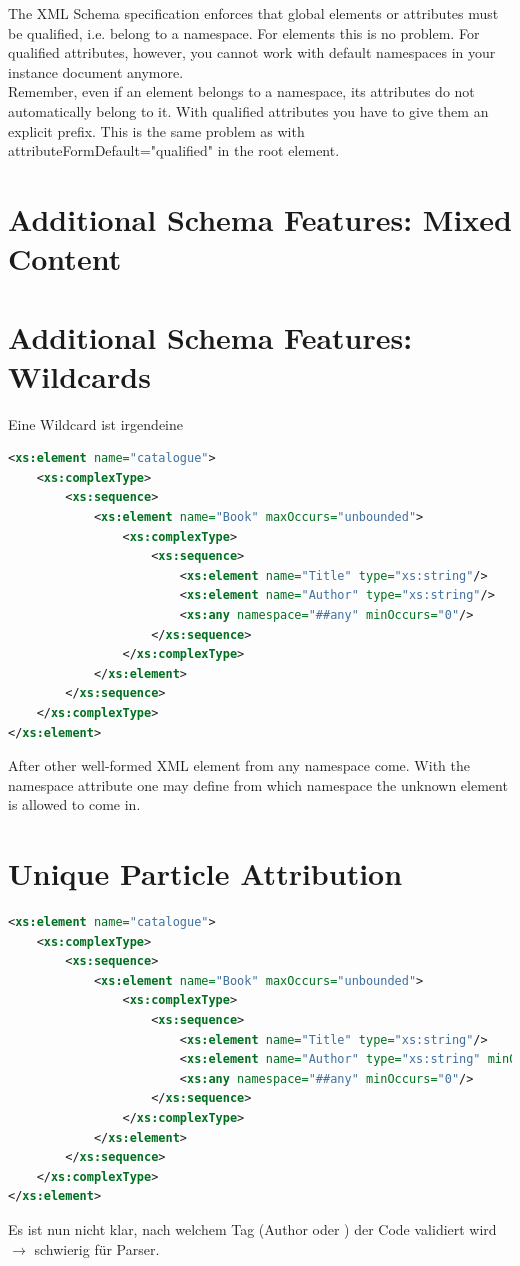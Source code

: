 The XML Schema specification enforces that global elements or attributes must be qualified, i.e. belong to a namespace. For elements this is no problem. For qualified attributes, however, you cannot work with default namespaces in your instance document anymore.\\
Remember, even if an element belongs to a namespace, its attributes do not automatically belong to it. With qualified attributes you have to give them an explicit prefix. This is the same problem as with attributeFormDefault="qualified" in the root element.


\section{Additional Schema Features: Mixed Content}

\section{Additional Schema Features: Wildcards}
Eine Wildcard ist irgendeine 
\begin{lstlisting}[language=XML, caption={Sequences with Global Definitions}]
<xs:element name="catalogue"> 
	<xs:complexType>
		<xs:sequence>
			<xs:element name="Book" maxOccurs="unbounded">
				<xs:complexType>
					<xs:sequence>
						<xs:element name="Title" type="xs:string"/> 
						<xs:element name="Author" type="xs:string"/> 
						<xs:any namespace="##any" minOccurs="0"/>
					</xs:sequence>
				</xs:complexType>
			</xs:element>
		</xs:sequence>
	</xs:complexType>
</xs:element>
\end{lstlisting}

After   other well-formed XML element from any namespace  come. With the namespace attribute one may define from which namespace the unknown element is allowed to come in.

\section{Unique Particle Attribution}
\begin{lstlisting}[language=XML, caption={Sequences with Global Definitions}]
<xs:element name="catalogue"> 
	<xs:complexType>
		<xs:sequence>
			<xs:element name="Book" maxOccurs="unbounded">
				<xs:complexType>
					<xs:sequence>
						<xs:element name="Title" type="xs:string"/> 
						<xs:element name="Author" type="xs:string" minOccurs="0"/> 
						<xs:any namespace="##any" minOccurs="0"/>
					</xs:sequence>
				</xs:complexType>
			</xs:element>
		</xs:sequence>
	</xs:complexType>
</xs:element>
\end{lstlisting}
Es ist nun nicht klar, nach welchem Tag (Author oder ) der Code validiert wird $\rightarrow$ schwierig für Parser.

